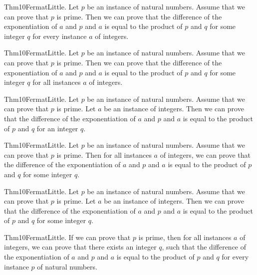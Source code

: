 \documentclass{article}
\begin{document}
Thm10FermatLittle. Let $p$ be an instance of natural numbers. Assume that we can prove that $p$ is prime. Then we can prove that the difference of the exponentiation of $a$ and $p$ and $a$ is equal to the product of $p$ and $q$ for some integer $q$ for every instance $a$ of integers.

Thm10FermatLittle. Let $p$ be an instance of natural numbers. Assume that we can prove that $p$ is prime. Then we can prove that the difference of the exponentiation of $a$ and $p$ and $a$ is equal to the product of $p$ and $q$ for some integer $q$ for all instances $a$ of integers.

Thm10FermatLittle. Let $p$ be an instance of natural numbers. Assume that we can prove that $p$ is prime. Let $a$ be an instance of integers. Then we can prove that the difference of the exponentiation of $a$ and $p$ and $a$ is equal to the product of $p$ and $q$ for an integer $q$.

Thm10FermatLittle. Let $p$ be an instance of natural numbers. Assume that we can prove that $p$ is prime. Then for all instances $a$ of integers, we can prove that the difference of the exponentiation of $a$ and $p$ and $a$ is equal to the product of $p$ and $q$ for some integer $q$.

Thm10FermatLittle. Let $p$ be an instance of natural numbers. Assume that we can prove that $p$ is prime. Let $a$ be an instance of integers. Then we can prove that the difference of the exponentiation of $a$ and $p$ and $a$ is equal to the product of $p$ and $q$ for some integer $q$.

Thm10FermatLittle. If we can prove that $p$ is prime, then for all instances $a$ of integers, we can prove that there exists an integer $q$, such that the difference of the exponentiation of $a$ and $p$ and $a$ is equal to the product of $p$ and $q$ for every instance $p$ of natural numbers.
\end{document}
